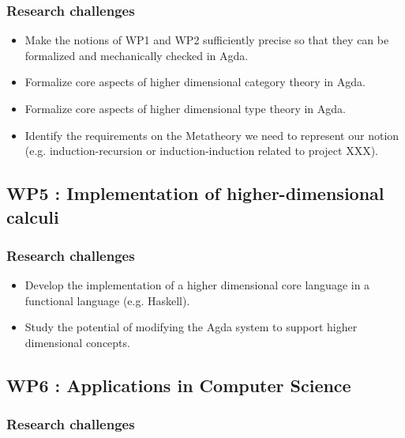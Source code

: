\documentclass[a4paper]{article}
\begin{document}
\subsubsection*{Research challenges}

\begin{itemize}
\item Make the notions of WP1 and WP2 sufficiently precise so that they
  can be formalized and mechanically checked in Agda.

\item Formalize core aspects of higher dimensional category theory in
  Agda.

\item Formalize core aspects of higher dimensional type theory in Agda.

\item Identify the requirements on the Metatheory we need to represent
  our notion (e.g. induction-recursion or induction-induction related
  to project XXX).

\end{itemize}

\subsection*{WP5 : Implementation of higher-dimensional calculi} 



\subsubsection*{Research challenges}

\begin{itemize}
\item Develop the implementation of a higher dimensional core language
  in a functional language (e.g. Haskell).

\item Study the potential of modifying the Agda system to support
  higher dimensional concepts.
  
\end{itemize}


\subsection*{WP6 : Applications in Computer Science} 
\label{sec:wp:qio}

\subsubsection*{Research challenges}
\label{sec:rsearch-challenges}
\end{document}
